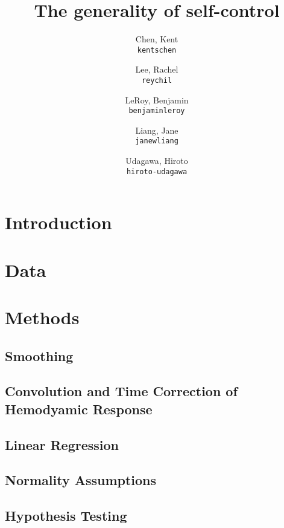 \documentclass[11pt]{article}
\title{The generality of self-control}
\author{
  Chen, Kent\\
  \texttt{kentschen}
  \and
  Lee, Rachel\\
  \texttt{reychil}
  \and
  LeRoy, Benjamin\\
  \texttt{benjaminleroy}
  \and
  Liang, Jane\\
  \texttt{janewliang}
  \and
  Udagawa, Hiroto\\
  \texttt{hiroto-udagawa}
}
\begin{document}
\maketitle

\abstract{}

\section{Introduction} \label{introduction}
	

\section{Data} \label{data}

	
	
\section{Methods} \label{methods}
	\subsection{Smoothing}
	
		

	\subsection{Convolution and Time Correction of Hemodyamic Response}

		
		
	\subsection{Linear Regression}
	
		

	\subsection{Normality Assumptions}
	
		
		
	\subsection{Hypothesis Testing}
	
\end{document}
